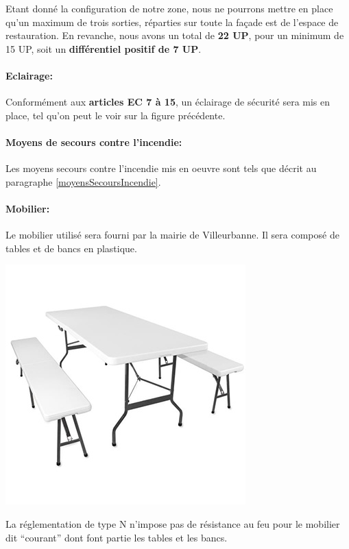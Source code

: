 \documentclass[hidelinks, paper=a4, fontsize=13pt]{report}
\begin{document}
Etant donné la configuration de notre zone, nous ne pourrons mettre en place qu'un maximum de trois sorties, réparties sur toute la façade est de l'espace de restauration. En revanche, nous avons un total de \textbf{22 UP}, pour un minimum de 15 UP, soit un \textbf{différentiel positif de 7 UP}. 

\paragraph{Eclairage:}

Conformément aux \textbf{articles EC 7 à 15}, un éclairage de sécurité sera mis en place, tel qu'on peut le voir sur la figure précédente.

\paragraph{Moyens de secours contre l'incendie:}

Les moyens secours contre l'incendie mis en oeuvre sont tels que décrit au paragraphe \ref{moyensSecoursIncendie}.

\paragraph{Mobilier:}
Le mobilier utilisé sera fourni par la mairie de Villeurbanne. Il sera composé de tables et de bancs en plastique. 
\begin{center}
	\includegraphics[scale=1]{Annexes/Images/tables}
\end{center}
La réglementation de type N n’impose pas de résistance au feu pour le mobilier dit “courant” dont font partie les tables et les bancs. \\
\end{document}
